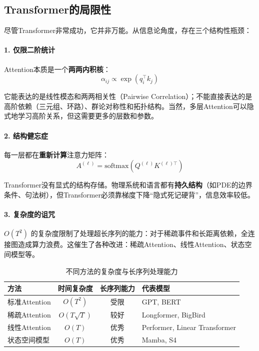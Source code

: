 \subsection{Transformer的局限性}

尽管Transformer非常成功，它并非万能。从信息论角度，存在三个结构性瓶颈：

\paragraph{1. 仅限二阶统计}

Attention本质是一个\textbf{两两内积核}：
\begin{equation}
    \alpha_{ij} \propto \exp(q_i^\top k_j)
\end{equation}

它能表达的是线性模态和两两相关性（Pairwise Correlation）；不能直接表达的是高阶依赖（三元组、环路）、群论对称性和拓扑结构。当然，多层Attention可以隐式地学习高阶关系，但这需要更多的层数和参数。

\paragraph{2. 结构健忘症}

每一层都在\textbf{重新计算}注意力矩阵：
\begin{equation}
    A^{(\ell)} = \text{softmax}(Q^{(\ell)} K^{(\ell)\top})
\end{equation}

Transformer没有显式的结构存储。物理系统和语言都有\textbf{持久结构}（如PDE的边界条件、句法树），但Transformer必须靠梯度下降“隐式死记硬背”，信息效率较低。

\paragraph{3. 复杂度的诅咒}

$O(T^2)$ 的复杂度限制了处理超长序列的能力：对于稀疏事件和长距离依赖，全连接图造成算力浪费。这催生了各种改进：稀疏Attention、线性Attention、状态空间模型等。

\begin{table}[htbp]
\centering
\renewcommand{\arraystretch}{1.4}
\begin{tabularx}{\textwidth}{l|c|c|X}
\toprule
方法 & 时间复杂度 & 长序列能力 & 代表模型 \\
\midrule
标准Attention & $O(T^2)$ & 受限 & GPT, BERT \\
稀疏Attention & $O(T \sqrt{T})$ & 较好 & Longformer, BigBird \\
线性Attention & $O(T)$ & 优秀 & Performer, Linear Transformer \\
状态空间模型 & $O(T)$ & 优秀 & Mamba, S4 \\
\bottomrule
\end{tabularx}
\caption{不同方法的复杂度与长序列处理能力}
\end{table}

